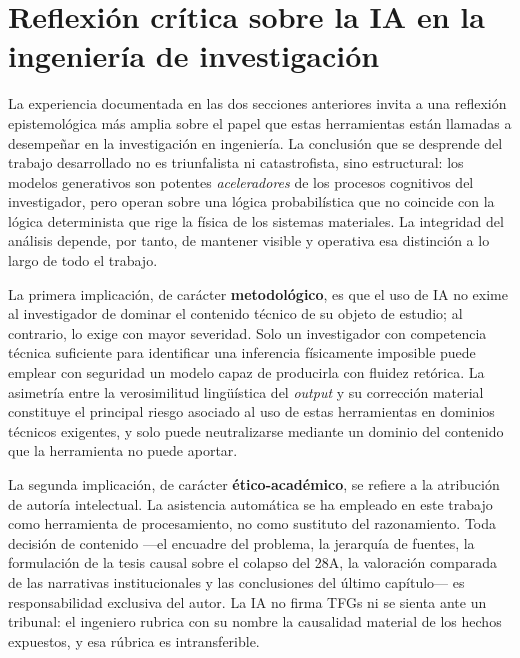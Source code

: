 \section{Reflexión crítica sobre la IA en la ingeniería de investigación}
\label{sec:reflexion_ia}

La experiencia documentada en las dos secciones anteriores invita a una
reflexión epistemológica más amplia sobre el papel que estas herramientas
están llamadas a desempeñar en la investigación en ingeniería. La conclusión
que se desprende del trabajo desarrollado no es triunfalista ni
catastrofista, sino estructural: los modelos generativos son potentes
\textit{aceleradores} de los procesos cognitivos del investigador, pero
operan sobre una lógica probabilística que no coincide con la lógica
determinista que rige la física de los sistemas materiales. La integridad
del análisis depende, por tanto, de mantener visible y operativa esa
distinción a lo largo de todo el trabajo.

La primera implicación, de carácter \textbf{metodológico}, es que el uso de
IA no exime al investigador de dominar el contenido técnico de su objeto de
estudio; al contrario, lo exige con mayor severidad. Solo un investigador con
competencia técnica suficiente para identificar una inferencia físicamente
imposible puede emplear con seguridad un modelo capaz de producirla con
fluidez retórica. La asimetría entre la verosimilitud lingüística del
\textit{output} y su corrección material constituye el principal riesgo
asociado al uso de estas herramientas en dominios técnicos exigentes, y solo
puede neutralizarse mediante un dominio del contenido que la herramienta no
puede aportar.

La segunda implicación, de carácter \textbf{ético-académico}, se refiere a
la atribución de autoría intelectual. La asistencia automática se ha
empleado en este trabajo como herramienta de procesamiento, no como
sustituto del razonamiento. Toda decisión de contenido ---el encuadre del
problema, la jerarquía de fuentes, la formulación de la tesis causal sobre
el colapso del 28A, la valoración comparada de las narrativas
institucionales y las conclusiones del último capítulo--- es responsabilidad
exclusiva del autor. La IA no firma TFGs ni se sienta ante un tribunal: el
ingeniero rubrica con su nombre la causalidad material de los hechos
expuestos, y esa rúbrica es intransferible.

